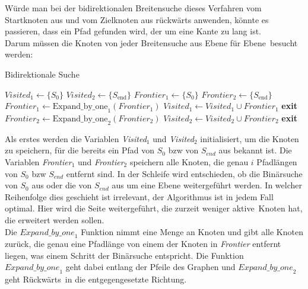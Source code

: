 \documentclass[a4paper,10pt,ngerman]{scrartcl}
\begin{document}
    Würde man bei der bidirektionalen Breitensuche dieses Verfahren vom Startknoten aus und vom Zielknoten aus rückwärts anwenden, könnte es passieren, dass ein Pfad gefunden wird, der um eine Kante zu lang ist. \\
    Darum müssen die Knoten von jeder Breitensuche aus \glqq Ebene für Ebene\grqq~besucht werden:
    \begin{algorithm}[H]
        \caption{Bidirektionale Suche}
        \label{alg:bidirectional-search}
        \begin{algorithmic}[1]
            \State $Visited_{1} \gets \{S_{0}\}$
            \State $Visited_{2} \gets \{S_{\text{end}}\}$
            \State $Frontier_{1} \gets \{S_{0}\}$
            \State $Frontier_{2} \gets \{S_{\text{end}}\}$
                    \State $Frontier_{1} \gets \text{Expand\_by\_one}_1(Frontier_{1})$
                    \State $Visited_{1} \gets Visited_{1} \cup Frontier_{1}$
                        \State \textbf{exit} 
                    \EndIf
                \Else
                    \State $Frontier_{2} \gets \text{Expand\_by\_one}_2(Frontier_{2})$
                    \State $Visited_{2} \gets Visited_{2} \cup Frontier_{2}$
                        \State \textbf{exit} 
                    \EndIf
                \EndIf
            \EndWhile
        \end{algorithmic}
    \end{algorithm}
    Als erstes werden die Variablen \textit{Visited$_1$} und \textit{Visited$_2$} initialisiert, um die Knoten zu speichern, für die bereits ein Pfad von $S_0$ bzw von $S_{end}$ aus bekannt ist. Die Variablen \textit{Frontier$_1$} und \textit{Frontier$_2$} speichern alle Knoten, die genau $i$ Pfadlängen von $S_0$ bzw $S_{end}$ entfernt sind. In der Schleife wird entschieden, ob die Binärsuche von $S_0$ aus oder die von $S_{end}$ aus um eine Ebene weitergeführt werden. In welcher Reihenfolge dies geschieht ist irrelevant, der Algorithmus ist in jedem Fall optimal. Hier wird die Seite weitergeführt, die zurzeit weniger \glqq aktive\grqq~Knoten hat, die erweitert werden sollen.\\
    Die $\textit{Expand\_by\_one}_1$ Funktion nimmt eine Menge an Knoten und gibt alle Knoten zurück, die genau eine Pfadlänge von einem der Knoten in \textit{Frontier} entfernt liegen, was einem Schritt der Binärsuche entspricht. Die Funktion $\textit{Expand\_by\_one}_1$ geht dabei entlang der Pfeile des Graphen und $\textit{Expand\_by\_one}_2$ geht \glqq Rückwärts\grqq~in die entgegengesetzte Richtung. \\
\end{document}
